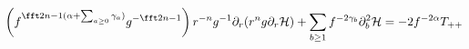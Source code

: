 \begin{equation}
\left(f^{\fft2{n-1}(\alpha+\sum_{a\ge0}\gamma_a)}g^{-\fft2{n-1}}\right)
r^{-n}g^{-1}\partial_r(r^ng\partial_r {\cal H})
+ \sum_{b\ge1} f^{-2\gamma_b} \partial_b^2 {\cal H}
=-2f^{-2\alpha}T_{++}
\end{equation}

